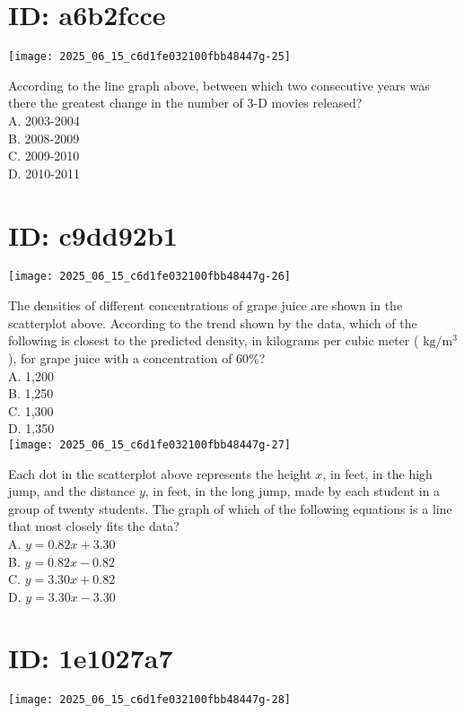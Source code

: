 \section*{ID: a6b2fcce}
\begin{center}
\texttt{[image: 2025\_06\_15\_c6d1fe032100fbb48447g-25]}
\end{center}

According to the line graph above, between which two consecutive years was there the greatest change in the number of 3-D movies released?\\
A. 2003-2004\\
B. 2008-2009\\
C. 2009-2010\\
D. 2010-2011

\section*{ID: c9dd92b1}
\begin{center}
\texttt{[image: 2025\_06\_15\_c6d1fe032100fbb48447g-26]}
\end{center}

The densities of different concentrations of grape juice are shown in the scatterplot above. According to the trend shown by the data, which of the following is closest to the predicted density, in kilograms per cubic meter ( $\mathrm{kg} / \mathrm{m}^{3}$ ), for grape juice with a concentration of 60\%?\\
A. 1,200\\
B. 1,250\\
C. 1,300\\
D. 1,350\\
\texttt{[image: 2025\_06\_15\_c6d1fe032100fbb48447g-27]}

Each dot in the scatterplot above represents the height $x$, in feet, in the high jump, and the distance $y$, in feet, in the long jump, made by each student in a group of twenty students. The graph of which of the following equations is a line that most closely fits the data?\\
A. $y=0.82 x+3.30$\\
B. $y=0.82 x-0.82$\\
C. $y=3.30 x+0.82$\\
D. $y=3.30 x-3.30$

\section*{ID: 1e1027a7}
\begin{center}
\texttt{[image: 2025\_06\_15\_c6d1fe032100fbb48447g-28]}
\end{center}

